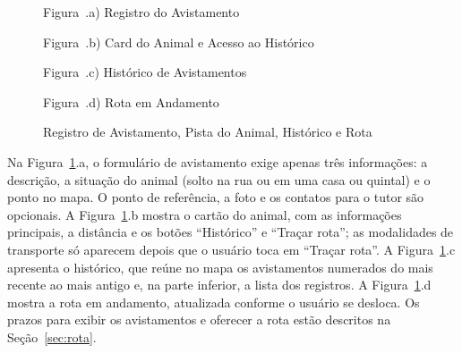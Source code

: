 \begin{figure}[H]
    \centering
    \caption{Registro de Avistamento, Pista do Animal, Histórico e Rota}
    \label{fig:tela_rota_pistas}
    \vspace{0.15cm}
    \begin{minipage}[t]{0.48\textwidth}
        \centering
        \par\vspace{0.12cm}
        {\small Figura~\thefigure.a) Registro do Avistamento}
    \end{minipage}
    \hfill
    \begin{minipage}[t]{0.48\textwidth}
        \centering
        \par\vspace{0.12cm}
        {\small Figura~\thefigure.b) Card do Animal e Acesso ao Histórico}
    \end{minipage}
    \par\vspace{0.3cm}
    \begin{minipage}[t]{0.48\textwidth}
        \centering
        \par\vspace{0.12cm}
        {\small Figura~\thefigure.c) Histórico de Avistamentos}
    \end{minipage}
    \hfill
    \begin{minipage}[t]{0.48\textwidth}
        \centering
        \par\vspace{0.12cm}
        {\small Figura~\thefigure.d) Rota em Andamento}
    \end{minipage}
    \par\vspace{0.12cm}
\end{figure}

Na Figura~\ref{fig:tela_rota_pistas}.a, o formulário de avistamento exige apenas três informações: a descrição, a situação do animal (solto na rua ou em uma casa ou quintal) e o ponto no mapa. O ponto de referência, a foto e os contatos para o tutor são opcionais. A Figura~\ref{fig:tela_rota_pistas}.b mostra o cartão do animal, com as informações principais, a distância e os botões ``Histórico'' e ``Traçar rota''; as modalidades de transporte só aparecem depois que o usuário toca em ``Traçar rota''. A Figura~\ref{fig:tela_rota_pistas}.c apresenta o histórico, que reúne no mapa os avistamentos numerados do mais recente ao mais antigo e, na parte inferior, a lista dos registros. A Figura~\ref{fig:tela_rota_pistas}.d mostra a rota em andamento, atualizada conforme o usuário se desloca. Os prazos para exibir os avistamentos e oferecer a rota estão descritos na Seção~\ref{sec:rota}.

